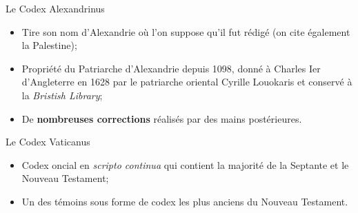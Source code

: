 \documentclass[11pt]{beamer}
\begin{document}
\begin{frame}{Le Codex Alexandrinus}

\begin{itemize}
    \item Tire son nom d'Alexandrie où l'on suppose qu'il fut rédigé (on cite également la Palestine);
    \item Propriété du Patriarche d'Alexandrie depuis 1098, donné à Charles Ier d'Angleterre en 1628 par le patriarche oriental Cyrille Louokaris et conservé à la \emph{Bristish Library};
    \item De \textbf{nombreuses corrections} réalisés par des mains postérieures.
\end{itemize}
    
\end{frame}

\begin{frame}{Le Codex Vaticanus}
    \begin{block}{}
    \begin{itemize}
        \item Codex oncial en \textit{scripto continua} qui contient la majorité de la Septante et le Nouveau Testament;
        \item Un des témoins sous forme de codex les plus anciens du Nouveau Testament.
    \end{itemize}
\end{block}



\end{frame}
\end{document}
